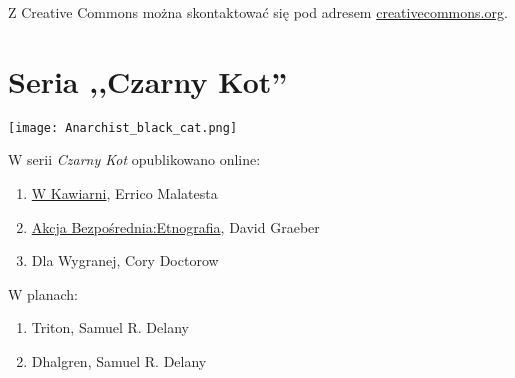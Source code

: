 \documentclass[oneside,polish,11pt,rmheadings]{mwbk}
\begin{document}
Z Creative Commons można skontaktować się pod adresem \href{https://creativecommons.org/}{creativecommons.org}. 

\chapter*{Seria ,,Czarny Kot''}



\begin{center}
\texttt{[image: Anarchist\_black\_cat.png]}

\begin{large}
W serii \textit{Czarny Kot} opublikowano online:
\end{large} 
\end{center}

\begin{enumerate}
\item \href{https://archive.org/details/errico-malatesta-w-kawiarni}{W Kawiarni}, Errico Malatesta
\item \href{https://archive.org/details/david-graeber-akcja-bezposrednia}{Akcja Bezpośrednia:Etnografia}, David Graeber
\item Dla Wygranej, Cory Doctorow
\end{enumerate}


\begin{center}

\begin{large}W planach:\end{large}\end{center}

\begin{enumerate}

\item Triton, Samuel R. Delany  
\item Dhalgren, Samuel R. Delany
\end{enumerate}


\newpage
\end{document}
